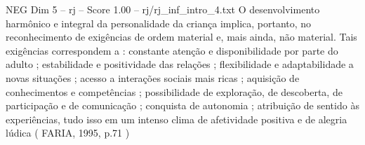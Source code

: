 \begin{textsample}{NEG Dim 5 – rj – Score 1.00 – rj/rj\_inf\_intro\_4.txt}
O desenvolvimento harmônico e integral da personalidade da criança implica, portanto, no reconhecimento de exigências de ordem material e, mais ainda, não material.
Tais exigências correspondem a : constante atenção e disponibilidade por parte do adulto ; estabilidade e positividade das relações ; flexibilidade e adaptabilidade a novas situações ; acesso a interações sociais mais ricas ; aquisição de conhecimentos e competências ; possibilidade de exploração, de descoberta, de participação e de comunicação ; conquista de autonomia ; atribuição de sentido às experiências, tudo isso em um intenso clima de afetividade positiva e de alegria lúdica ( FARIA, 1995, p.71 )

\end{textsample}
